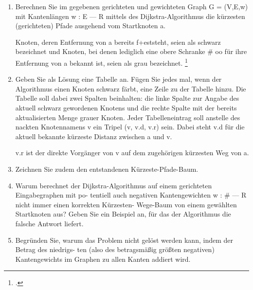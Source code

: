 \documentclass{lehramt-informatik-aufgabe}
\begin{document}
\begin{enumerate}


\item Berechnen Sie im gegebenen gerichteten und gewichteten Graph G =
(V,E,w) mit Kantenlängen w : E — R mittels des Dijkstra-Algorithmus die
kürzesten (gerichteten) Pfade ausgehend vom Startknoten a.

Knoten, deren Entfernung von a bereits f+eststeht, seien als schwarz
bezeichnet und Knoten, bei denen lediglich eine obere Schranke \# oo für
ihre Entfernung von a bekannt ist, seien als grau
bezeichnet.
\footcite{examen:46115:2021:03}


\item Geben Sie als Lösung eine Tabelle an. Fügen Sie jedes mal, wenn
der Algorithmus einen Knoten schwarz färbt, eine Zeile zu der Tabelle
hinzu. Die Tabelle soll dabei zwei Spalten beinhalten: die linke Spalte
zur Angabe des aktuell schwarz gewordenen Knotens und die rechte Spalte
mit der bereits aktualisierten Menge grauer Knoten. Jeder
Tabelleneintrag soll anstelle des nackten Knotennamens v ein Tripel (v,
v.d, v.r) sein. Dabei steht v.d für die aktuell bekannte kürzeste
Distanz zwischen a und v.

v.r ist der direkte Vorgänger von v auf dem zugehörigen kürzesten Weg von a.


\item Zeichnen Sie zudem den entstandenen Kürzeste-Pfade-Baum.


\item Warum berechnet der Dijkstra-Algorithmus auf einem gerichteten
Eingabegraphen mit po- tentiell auch negativen Kantengewichten w : \# —
R nicht immer einen korrekten Kürzesten- Wege-Baum von einem gewählten
Startknoten aus? Geben Sie ein Beispiel an, für das der Algorithmus die
falsche Antwort liefert.


\item Begründen Sie, warum das Problem nicht gelöst werden kann, indem
der Betrag des niedrigs- ten (also des betragsmäßig größten negativen)
Kantengewichts im Graphen zu allen Kanten addiert wird.

\end{enumerate}
\end{document}
